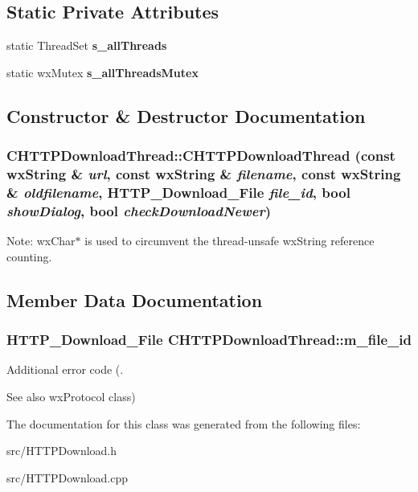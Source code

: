 \subsection*{Static Private Attributes}
\begin{DoxyCompactItemize}
\item 
static ThreadSet {\bfseries s\_\-allThreads}\label{classCHTTPDownloadThread_ad21170e2a52f852cf497767088863074}

\item 
static wxMutex {\bfseries s\_\-allThreadsMutex}\label{classCHTTPDownloadThread_acb419d83fb83f42671b2d9b8d70bc407}

\end{DoxyCompactItemize}


\subsection{Constructor \& Destructor Documentation}
\subsubsection[{CHTTPDownloadThread}]{\setlength{\rightskip}{0pt plus 5cm}CHTTPDownloadThread::CHTTPDownloadThread (const wxString \& {\em url}, \/  const wxString \& {\em filename}, \/  const wxString \& {\em oldfilename}, \/  HTTP\_\-Download\_\-File {\em file\_\-id}, \/  bool {\em showDialog}, \/  bool {\em checkDownloadNewer})}\label{classCHTTPDownloadThread_a5fe1eaf0ab12e96abe999bffb5dc7994}


Note: wxChar$\ast$ is used to circumvent the thread-\/unsafe wxString reference counting. 

\subsection{Member Data Documentation}
\subsubsection[{m\_\-file\_\-id}]{\setlength{\rightskip}{0pt plus 5cm}HTTP\_\-Download\_\-File {\bf CHTTPDownloadThread::m\_\-file\_\-id}\hspace{0.3cm}{\ttfamily  [private]}}\label{classCHTTPDownloadThread_a0f48b1fae046a2b6b285b32cd6babdc8}


Additional error code (. \begin{DoxySeeAlso}{See also}
wxProtocol class) 
\end{DoxySeeAlso}


The documentation for this class was generated from the following files:\begin{DoxyCompactItemize}
\item 
src/HTTPDownload.h\item 
src/HTTPDownload.cpp\end{DoxyCompactItemize}
